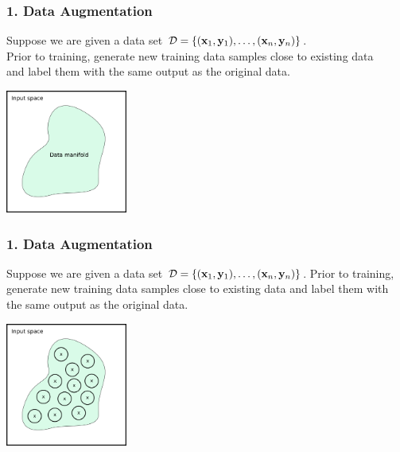 \documentclass[t,compress,aspectratio=169]{beamer}
\begin{document}
\begin{frame}[fragile]
  \frametitle{1. Data Augmentation}
  \vspace{-1em}
  Suppose we are given a data set $\mathcal{D} =  \{(\mathbf{x}_1, \mathbf{y}_1), \ldots , (\mathbf{x}_n, \mathbf{y}_n)\}$. \\
  Prior to training, generate new training data samples close to existing data\\ and label them with the same output as the original data.
      {\scriptsize
 \begin{thebibliography}{99}
   \beamertemplatearticlebibitems
\end{thebibliography}}

\pause

\begin{center}

  \includegraphics[width=4cm]{img/SR-vs-CR-1.png}

  \end{center}

\end{frame}


\begin{frame}[fragile]
  \frametitle{1. Data Augmentation}

    \vspace{-1em}



  Suppose we are given a data set $\mathcal{D} =  \{(\mathbf{x}_1, \mathbf{y}_1), \ldots , (\mathbf{x}_n, \mathbf{y}_n)\}$.
  Prior to training, generate new training data samples close to existing data and label them with the same output as the original data.
      {\scriptsize
 \begin{thebibliography}{99}
   \beamertemplatearticlebibitems
\end{thebibliography}}


\begin{center}

  \includegraphics[width=4cm]{img/SR-vs-CR-2.png}

  \end{center}

\end{frame}
\end{document}
